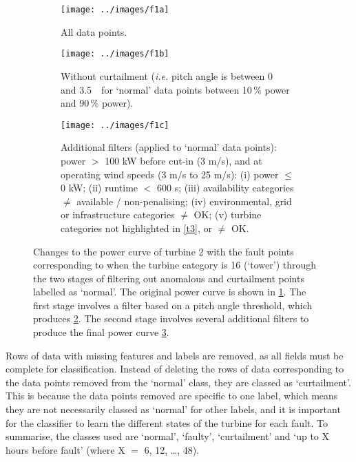 \begin{figure}
  \centering
  \begin{subfigure}[t]{.5\textwidth}
    \centering
    \texttt{[image: ../images/f1a]}
    \caption{\label{f1a}All data points.}
  \end{subfigure}%
  \begin{subfigure}[t]{.5\textwidth}
    \centering
    \texttt{[image: ../images/f1b]}
    \caption{\label{f1b}Without curtailment (\textit{i.e.} pitch angle is between
    0\,\textdegree~ and 3.5\,\textdegree~ for `normal' data points between
    10\,\% power and 90\,\% power).}
  \end{subfigure}
  \begin{subfigure}[t]{.5\textwidth}
    \centering
    \texttt{[image: ../images/f1c]}
    \caption{\label{f1c}
      Additional filters (applied to `normal' data points): power \ensuremath{>} 100 kW
      before cut-in (3 m/s), and at operating wind speeds (3 m/s to 25 m/s):
      (i) power \ensuremath{\leq} 0 kW; (ii) runtime \ensuremath{<} 600 s; (iii) availability
      categories \ensuremath{\neq} available / non-penalising; (iv) environmental, grid
      or infrastructure categories \ensuremath{\neq} OK; (v) turbine categories not
      highlighted in \autoref{t3}, or \ensuremath{\neq} OK.
    }
  \end{subfigure}
  \caption{\label{f1}Changes to the power curve of turbine 2 with the fault
  points corresponding to when the turbine category is 16 (`tower') through
  the two stages of filtering out anomalous and curtailment points labelled as
  `normal'. The original power curve is shown in \ref{f1a}. The first stage
  involves a filter based on a pitch angle threshold, which produces
  \ref{f1b}. The second stage involves several additional filters to produce
  the final power curve \ref{f1c}.}
\end{figure}

Rows of data with missing features and labels are removed, as all fields must
be complete for classification. Instead of deleting the rows of data
corresponding to the data points removed from the `normal' class, they are
classed as `curtailment'. This is because the data points removed are specific
to one label, which means they are not necessarily classed as `normal' for
other labels, and it is important for the classifier to learn the different
states of the turbine for each fault. To summarise, the classes used are
`normal', `faulty', `curtailment' and `up to X hours before fault' (where X
\ensuremath{=} 6, 12, \dots, 48). 

